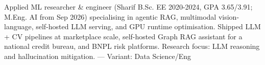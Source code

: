 \small{Applied ML researcher \& engineer (Sharif B.Sc. EE 2020-2024, GPA 3.65/3.91; M.Eng. AI from Sep 2026) specialising in agentic RAG, multimodal vision-language, self-hosted LLM serving, and GPU runtime optimisation. Shipped LLM + CV pipelines at marketplace scale, self-hosted Graph RAG assistant for a national credit bureau, and BNPL risk platforms. Research focus: LLM reasoning and hallucination mitigation.
 — Variant: Data Science/Eng}
